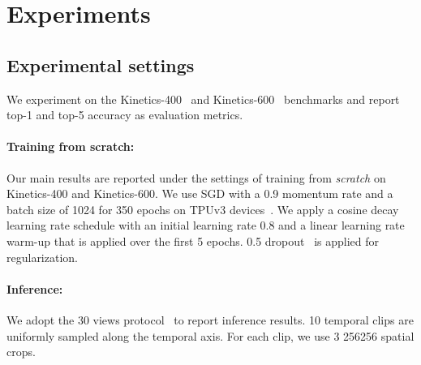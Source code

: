\documentclass{article} \usepackage{iclr2021_conference,times}
\begin{document}
\section{Experiments\label{sec:exp}}

\subsection{Experimental settings}
We experiment on the Kinetics-400~\cite{K400} and Kinetics-600~\cite{K600} benchmarks and report top-1 and top-5 accuracy as evaluation metrics.
\paragraph{Training from scratch:} Our main results are reported under the settings of training from \textit{scratch} on Kinetics-400 and Kinetics-600. We use SGD with a 0.9 momentum rate and a batch size of 1024 for 350 epochs on TPUv3 devices~\cite{jouppi2017tpu}. We apply a cosine decay learning rate schedule with an initial learning rate 0.8 and a linear learning rate warm-up that is applied over the first 5 epochs. 0.5 dropout~\cite{dropout} is applied for regularization.

\paragraph{Inference:} We adopt the 30 views protocol~\cite{Feichtenhofer2019SlowFastNF} to report inference results. 10 temporal clips are uniformly sampled along the temporal axis. For each clip, we use 3 256256 spatial crops. 
\end{document}

